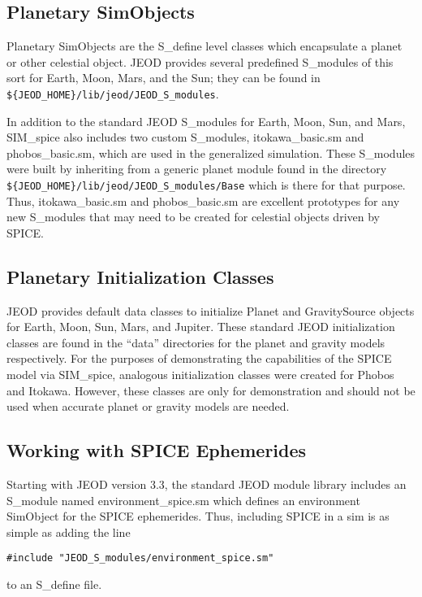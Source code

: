 \subsection{Planetary SimObjects}\label{subsec:planet.sm}
Planetary SimObjects are the S\_define level classes which encapsulate a planet
or other celestial object. JEOD provides several predefined S\_modules of this
sort for Earth, Moon, Mars, and the Sun; they can be found in
\verb|${JEOD_HOME}/lib/jeod/JEOD_S_modules|.

In addition to the standard JEOD S\_modules for Earth, Moon, Sun, and Mars,
SIM\_spice also includes two custom S\_modules, itokawa\_basic.sm and
phobos\_basic.sm, which are used in the generalized simulation. These
S\_modules were built by inheriting from a generic planet module found
in the directory \verb|${JEOD_HOME}/lib/jeod/JEOD_S_modules/Base| which is
there for that purpose. Thus, itokawa\_basic.sm and phobos\_basic.sm
are excellent prototypes for any new S\_modules that may need to be created
for celestial objects driven by SPICE.


\subsection{Planetary Initialization Classes}\label{subsec:planetary_init}
JEOD provides default data classes to initialize Planet and GravitySource
objects for Earth, Moon, Sun, Mars, and Jupiter. These standard JEOD
initialization classes are found in the ``data'' directories for the planet
and gravity models respectively.  For the purposes of demonstrating the
capabilities of the SPICE model via SIM\_spice, analogous initialization
classes were created for Phobos and Itokawa.  However, these classes are
only for demonstration and should not be used when accurate planet or gravity
models are needed.


\subsection{Working with SPICE Ephemerides}\label{subsec:spice_ephelmerides}
Starting with JEOD version 3.3, the standard JEOD module library includes
an S\_module named environment\_spice.sm which defines an environment
SimObject for the SPICE ephemerides. Thus, including SPICE in a sim is
as simple as adding the line
\begin{verbatim}
#include "JEOD_S_modules/environment_spice.sm"
\end{verbatim}
to an S\_define file.

